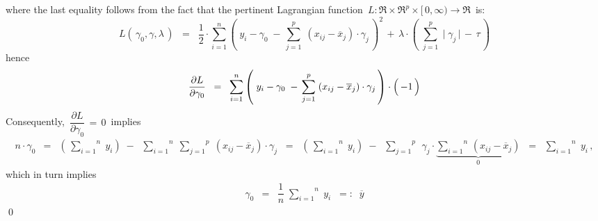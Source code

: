 where the last equality follows from the fact that the pertinent Lagrangian function
\,$L : \Re \times \Re^{p} \times [\,0,\infty) \longrightarrow \Re$\,
is:
\begin{equation*}
L(\,\gamma_{0},\gamma,\lambda\,)
\;\; = \;\;
	\dfrac{1}{2}\cdot
	\overset{n}{\underset{i=1}{\sum}}
	\left(\; y_{i} - \gamma_{0} \;-\, \overset{p}{\underset{j=1}{\sum}}\; (x_{ij}-\overline{x}_{j})\cdot\gamma_{j}\,\right)^{2}
	\, + \,
	\lambda\cdot\left(\;
		\overset{p}{\underset{j=1}{\sum}}\;
		\vert\;\gamma_{j}\,\vert
		\,-\, \tau 
		\,\right)
\end{equation*}
hence
\begin{equation*}
\dfrac{\partial L}{\partial\gamma_{0}}
\;\; = \;\;
	\overset{n}{\underset{i=1}{\sum}}
	\left(\; y_{i} - \gamma_{0} \;-\, \overset{p}{\underset{j=1}{\sum}}\; (x_{ij}-\overline{x}_{j})\cdot\gamma_{j}\,\right)
	\cdot\left(\,\overset{{\color{white}.}}{-1}\,\right)
\end{equation*}
Consequently, \,$\dfrac{\partial L}{\partial\gamma_{0}} \, = \, 0$\, implies
\begin{eqnarray*}
n\cdot\gamma_{0}
& = &
	\left(\, \overset{n}{\underset{i=1}{\sum}}\; y_{i} \right)
	\;-\;\;
	\overset{n}{\underset{i=1}{\sum}}\;
	\overset{p}{\underset{j=1}{\sum}}\;
	(x_{ij}-\overline{x}_{j})\cdot\gamma_{j}
\;\; = \;\;
	\left(\, \overset{n}{\underset{i=1}{\sum}}\; y_{i} \right)
	\;-\;\;
	\overset{p}{\underset{j=1}{\sum}}\;\,
	\gamma_{j}\cdot
	\underset{0}{\underbrace{\overset{n}{\underset{i=1}{\sum}}\,(x_{ij}-\overline{x}_{j})}}
\;\; = \;\;
	\overset{n}{\underset{i=1}{\sum}}\; y_{i}\,,
\end{eqnarray*}
which in turn implies
\begin{eqnarray*}
\gamma_{0}
& = &
	\dfrac{1}{n}\;\overset{n}{\underset{i=1}{\sum}}\; y_{i}
\;\; =: \;\;
	\overline{y}
\end{eqnarray*}
\qed


